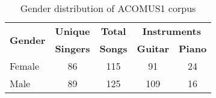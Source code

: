 \begin{table}[!htb]
    \caption{Gender distribution of ACOMUS1 corpus}
    \centering
    \label{table:genderACOMUS1}
    \begin{tabular}{l|c c c c}
        \hline
        \multirow{2}{*}{\textbf{Gender}} & 
        \textbf{Unique} & 
        \textbf{Total} & 
            \multicolumn{2}{c}{\textbf{Instruments}} \\
        {} & \textbf{Singers} & {\textbf{Songs}} & {\textbf{Guitar}} & {\textbf{Piano}}\\
        \hline 
        Female 	& 86 & 115 & 91 & 24 \\
        Male 	& 89 & 125 & 109 & 16
    \end{tabular}
\end{table}